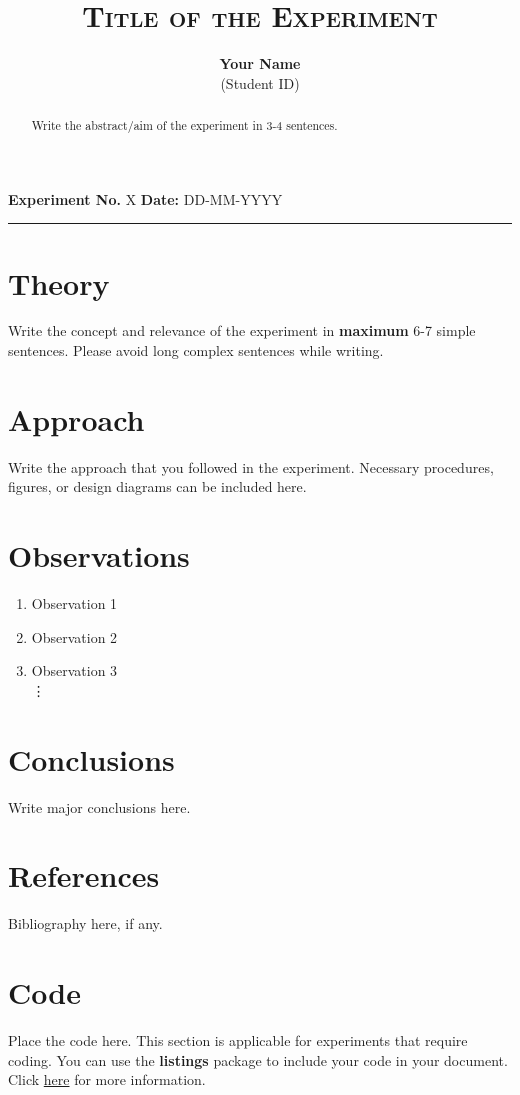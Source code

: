 \documentclass[11pt]{article}
\title{\vspace{-2cm}
\textsc{Title of the Experiment}
}
\author{\textbf{Your Name} \\ (Student ID)}
\date{} %
\begin{document}
\maketitle
\vspace*{-6mm}
\begin{center}
\textbf{Experiment No.} X \hfill \textbf{Date:} DD-MM-YYYY\\
\end{center}
\hrule

\begin{abstract}
Write the abstract/aim of the experiment in 3-4 sentences. 
\end{abstract}

\section{Theory}
Write the concept and relevance of the experiment in \textbf{maximum} 6-7 
simple sentences. Please avoid long complex sentences while writing. 

\section{Approach}
Write the approach that you followed in the experiment. Necessary 
procedures, figures, or design diagrams can be included here.

\section{Observations}
\begin{enumerate}
\item Observation 1
\item Observation 2
\item Observation 3 \\ 
\vdots
\end{enumerate}

\section{Conclusions}
Write major conclusions here.  

\section{References}
Bibliography here, if any.

\section{Code} 
Place the code here. This section is applicable for 
experiments that require coding. You can use the \textbf{listings} 
package to include your code in your document. Click 
\href{https://en.wikibooks.org/wiki/LaTeX/Source_Code_Listings}{here} 
for more information. 
\end{document}
